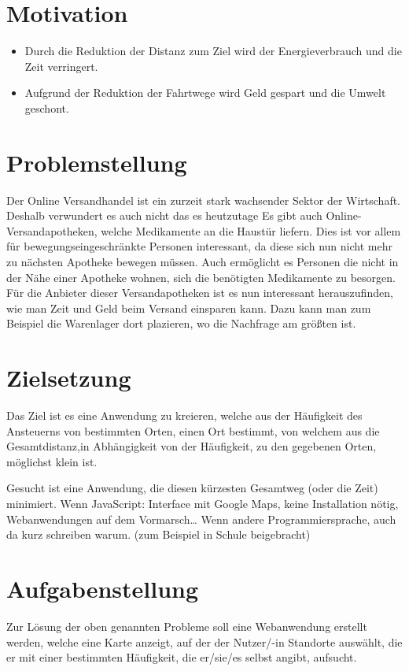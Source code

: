 \documentclass[a4paper, twoside, 12pt]{scrreprt}
\begin{document}
\section{Motivation}
\begin{itemize}
\item Durch die Reduktion der Distanz zum Ziel wird der Energieverbrauch und die Zeit verringert.
\item Aufgrund der Reduktion der Fahrtwege wird Geld gespart und die Umwelt geschont.
\end{itemize}
\section{Problemstellung}
Der Online Versandhandel ist ein zurzeit stark wachsender Sektor der Wirtschaft.
Deshalb verwundert es auch nicht das es heutzutage
Es gibt auch Online-Versandapotheken, welche Medikamente an die Haustür liefern.
Dies ist vor allem für bewegungseingeschränkte Personen interessant, da diese sich nun nicht mehr zu nächsten Apotheke bewegen müssen.
Auch ermöglicht es Personen die nicht in der Nähe einer Apotheke wohnen, sich die benötigten Medikamente zu besorgen.
Für die Anbieter dieser Versandapotheken ist es nun interessant herauszufinden, wie man Zeit und Geld beim Versand einsparen kann.
Dazu kann man zum Beispiel die Warenlager dort plazieren, wo die Nachfrage am größten ist.
\section{Zielsetzung}
Das Ziel ist es eine Anwendung zu kreieren, welche aus der Häufigkeit des Ansteuerns von bestimmten Orten, einen Ort bestimmt, von welchem aus die Gesamtdistanz,in Abhängigkeit von der Häufigkeit, zu den gegebenen Orten, möglichst klein ist.

Gesucht ist eine Anwendung, die diesen kürzesten Gesamtweg (oder die Zeit) minimiert.
Wenn JavaScript: Interface mit Google Maps, keine Installation nötig, Webanwendungen auf dem Vormarsch…
Wenn andere Programmiersprache, auch da kurz schreiben warum.
(zum Beispiel in Schule beigebracht)
\section{Aufgabenstellung}
Zur Lösung der oben genannten Probleme soll eine Webanwendung erstellt werden, welche eine Karte anzeigt, auf der der Nutzer/-in Standorte auswählt, die er mit einer bestimmten Häufigkeit, die er/sie/es selbst angibt, aufsucht.
\end{document}
